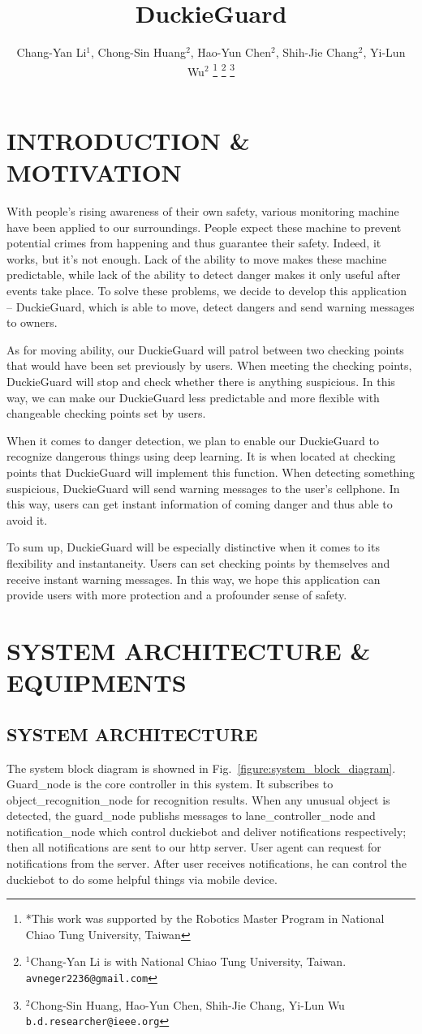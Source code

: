 \documentclass[letterpaper, 10 pt, conference]{ieeeconf}  %
\title{\LARGE \bf
DuckieGuard
}
\author{Chang-Yan Li$^{1}$, Chong-Sin Huang$^{2}$, Hao-Yun Chen$^{2}$, Shih-Jie Chang$^{2}$, Yi-Lun Wu$^{2}$%
\thanks{*This work was supported by the Robotics Master Program in National Chiao Tung University, Taiwan}%
\thanks{$^{1}$Chang-Yan Li is with National Chiao Tung University, Taiwan.
        {\tt\small avneger2236@gmail.com}}%
\thanks{$^{2}$Chong-Sin Huang, Hao-Yun Chen, Shih-Jie Chang, Yi-Lun Wu
        {\tt\small b.d.researcher@ieee.org}}%
}
\begin{document}
\maketitle
\pagestyle{empty}

\section{INTRODUCTION \& MOTIVATION}
With people’s rising awareness of their own safety, various monitoring machine have been applied to our surroundings. People expect these machine to prevent potential crimes from happening and thus guarantee their safety. Indeed, it works, but it’s not enough. Lack of the ability to move makes these machine predictable, while lack of the ability to detect danger makes it only useful after events take place. To solve these problems, we decide to develop this application – DuckieGuard, which is able to move, detect dangers and send warning messages to owners. 

As for moving ability, our DuckieGuard will patrol between two checking points that would have been set previously by users. When meeting the checking points, DuckieGuard will stop and check whether there is anything suspicious. In this way, we can make our DuckieGuard less predictable and more flexible with changeable checking points set by users.

When it comes to danger detection, we plan to enable our DuckieGuard to recognize dangerous things using deep learning. It is when located at checking points that DuckieGuard will implement this function. When detecting something suspicious, DuckieGuard will send warning messages to the user’s cellphone. In this way, users can get instant information of coming danger and thus able to avoid it.

To sum up, DuckieGuard will be especially distinctive when it comes to its flexibility and instantaneity. Users can set checking points by themselves and receive instant warning messages. In this way, we hope this application can provide users with more protection and a profounder sense of safety.

\section{SYSTEM ARCHITECTURE \& EQUIPMENTS}
\label{section:system_architecture}
\subsection{SYSTEM ARCHITECTURE}
The system block diagram is showned in Fig.~\ref{figure:system_block_diagram}.
Guard\_node is the core controller in this system. 
It subscribes to object\_recognition\_node for recognition results.
When any unusual object is detected, the guard\_node publishs messages
to lane\_controller\_node and notification\_node which control
duckiebot and deliver notifications respectively; then all notifications are sent to
our http server. User agent can request for notifications from the server.
After user receives notifications,
he can control the duckiebot to do some helpful things via mobile device.
\end{document}
